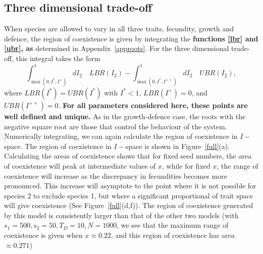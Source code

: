 \documentclass[preprint,10pt,reqno]{report}
\begin{document}
\subsection{Three dimensional trade-off}
When species are allowed to vary in all three traits, fecundity, growth and defence, the region of coexistence is given by integrating the \textbf{functions \eqref{lbr} and \eqref{ubr}, as} determined in Appendix~\ref{approots}. For the three dimensional trade-off, this integral takes the form
\begin{equation}
\int_{\max(0,I^*,I^+)}^1 dI_2 \quad LBR(I_2) - \int_{\max(0,I^*,I^{++})}^1 dI_2 \quad UBR(I_2),
\end{equation}
where $LBR(I^*)=UBR(I^*)$ with $I^*<1$, $LBR(I^+)=0$, and $UBR(I^{++})=0$. \textbf{For all parameters considered here, these points are well defined and unique.} As in the growth-defence case, the roots with the negative square root are those that control the behaviour of the system. Numerically integrating, we can again calculate the region of coexistence in $I-$space. The region of coexistence in $I-$space is shown in Figure~\ref{full}(a). Calculating the areas of coexistence shows that for fixed seed numbers, the area of coexistence will peak at intermediate values of $x$, while for fixed $x$, the range of coexistence will increase as the discrepancy in fecundities becomes more pronounced. This increase will asymptote to the point where it is not possible for species 2 to exclude species 1, but where a significant proportional of trait space will give coexistence (See Figure~\ref{full}(d,f)). The region of coexistence generated by this model is consistently larger than that of the other two models (with $s_1=500,s_2=50,T_D=10,N=1000$, we see that the maximum range of coexistence is given when $x\approx 0.22$, and this region of coexistence has area $\approx 0.271$)
\end{document}
